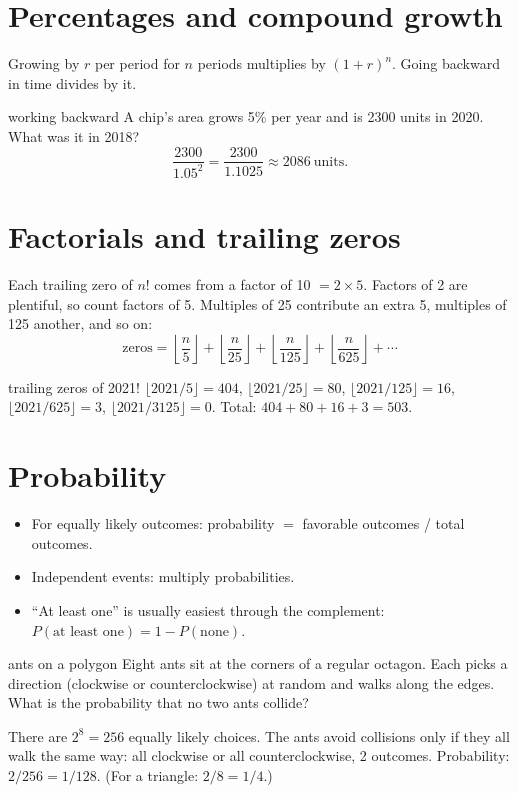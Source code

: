 \section{Percentages and compound growth}

Growing by $r$ per period for $n$ periods multiplies by $(1 + r)^n$. Going backward in time divides by it.

\begin{worked}{working backward}
A chip's area grows 5\% per year and is 2300 units in 2020. What was it in 2018?
\[
  \frac{2300}{1.05^2} = \frac{2300}{1.1025} \approx 2086~\text{units}.
\]
\end{worked}

\section{Factorials and trailing zeros}

Each trailing zero of $n!$ comes from a factor of 10 $= 2 \times 5$. Factors of 2 are plentiful, so count factors of 5. Multiples of 25 contribute an extra 5, multiples of 125 another, and so on:
\[
  \text{zeros} = \left\lfloor \frac{n}{5} \right\rfloor + \left\lfloor \frac{n}{25} \right\rfloor + \left\lfloor \frac{n}{125} \right\rfloor + \left\lfloor \frac{n}{625} \right\rfloor + \cdots
\]

\begin{worked}{trailing zeros of 2021!}
$\lfloor 2021/5 \rfloor = 404$, $\lfloor 2021/25 \rfloor = 80$, $\lfloor 2021/125 \rfloor = 16$, $\lfloor 2021/625 \rfloor = 3$, $\lfloor 2021/3125 \rfloor = 0$. Total: $404 + 80 + 16 + 3 = 503$.
\end{worked}

\section{Probability}

\begin{itemize}
  \item For equally likely outcomes: probability $=$ favorable outcomes / total outcomes.
  \item Independent events: multiply probabilities.
  \item ``At least one'' is usually easiest through the complement: $P(\text{at least one}) = 1 - P(\text{none})$.
\end{itemize}

\begin{worked}{ants on a polygon}
Eight ants sit at the corners of a regular octagon. Each picks a direction (clockwise or counterclockwise) at random and walks along the edges. What is the probability that no two ants collide?

There are $2^8 = 256$ equally likely choices. The ants avoid collisions only if they all walk the same way: all clockwise or all counterclockwise, 2 outcomes. Probability: $2/256 = 1/128$. (For a triangle: $2/8 = 1/4$.)
\end{worked}

